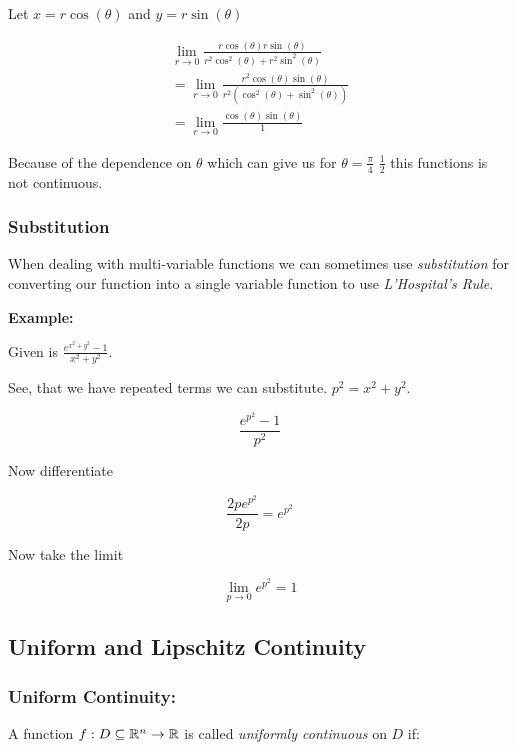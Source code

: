 Let \(x = r\cos(\theta)\) and \(y = r\sin(\theta)\)

\begin{align*}
    \lim_{r \to 0} \frac{r\cos(\theta)r\sin(\theta)}{r^2\cos^2(\theta) + r^2\sin^2(\theta)}\\
    = \lim_{r \to 0} \frac{r^2\cos(\theta)\sin(\theta)}{r^2(\cos^2(\theta) + \sin^2(\theta))}\\
    = \lim_{r \to 0} \frac{\cos(\theta)\sin(\theta)}{1}
\end{align*}

Because of the dependence on \(\theta\) which can give us for \(\theta = \frac{\pi}{4}\) \(\frac{1}{2}\) 
this functions is not continuous.

\subsubsection{Substitution}

When dealing with multi-variable functions we can sometimes use \emph{substitution} 
for converting our function into a single variable function to use \emph{L'Hospital's Rule}.
\vspace{\baselineskip}

\textbf{Example:}
\vspace{\baselineskip}

Given is \(\frac{e^{x^2 + y^2} - 1}{x^2 + y^2}\).
\vspace{\baselineskip}

See, that we have repeated terms we can substitute. \(p^2 = x^2 + y^2\).

\[
    \frac{e^{p^2} - 1}{p^2}
\]

Now differentiate

\[
    \frac{2p e^{p^2} }{2p} = e^{p^2}
\]

Now take the limit

\[
    \lim_{p \to 0} e^{p^2} = 1
\]

\subsection{Uniform and Lipschitz Continuity}

\subsubsection{Uniform Continuity:}  
A function \( f : D \subseteq \mathbb{R}^n \to \mathbb{R} \) is called \emph{uniformly continuous} on 
\( D \) if:

